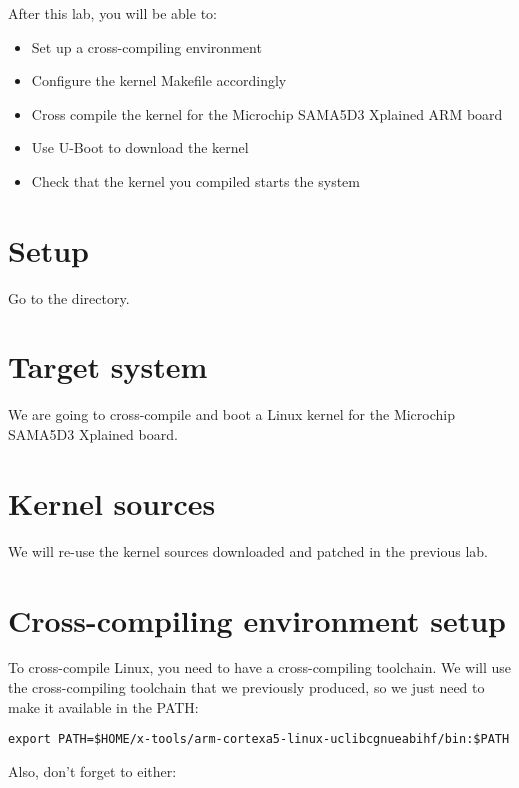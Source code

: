 
After this lab, you will be able to:
\begin{itemize}
\item Set up a cross-compiling environment
\item Configure the kernel Makefile accordingly
\item Cross compile the kernel for the Microchip SAMA5D3 Xplained ARM board
\item Use U-Boot to download the kernel
\item Check that the kernel you compiled starts the system
\end{itemize}

\section{Setup}

Go to the  directory.

\section{Target system}

We are going to cross-compile and boot a Linux kernel for the Microchip
SAMA5D3 Xplained board.

\section{Kernel sources}

We will re-use the kernel sources downloaded and patched in the
previous lab.

\section{Cross-compiling environment setup}

To cross-compile Linux, you need to have a cross-compiling
toolchain. We will use the cross-compiling toolchain that we
previously produced, so we just need to make it available in the PATH:

\begin{verbatim}
export PATH=$HOME/x-tools/arm-cortexa5-linux-uclibcgnueabihf/bin:$PATH
\end{verbatim}

Also, don't forget to either:

